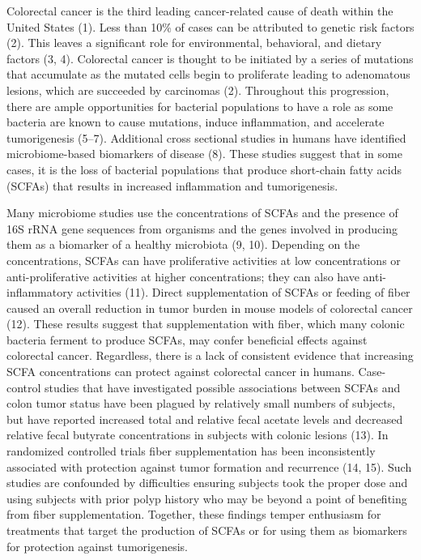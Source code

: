 \documentclass[11pt,]{article}
\begin{document}
\newpage

Colorectal cancer is the third leading cancer-related cause of death
within the United States (1). Less than 10\% of cases can be attributed
to genetic risk factors (2). This leaves a significant role for
environmental, behavioral, and dietary factors (3, 4). Colorectal cancer
is thought to be initiated by a series of mutations that accumulate as
the mutated cells begin to proliferate leading to adenomatous lesions,
which are succeeded by carcinomas (2). Throughout this progression,
there are ample opportunities for bacterial populations to have a role
as some bacteria are known to cause mutations, induce inflammation, and
accelerate tumorigenesis (5--7). Additional cross sectional studies in
humans have identified microbiome-based biomarkers of disease (8). These
studies suggest that in some cases, it is the loss of bacterial
populations that produce short-chain fatty acids (SCFAs) that results in
increased inflammation and tumorigenesis.

Many microbiome studies use the concentrations of SCFAs and the presence
of 16S rRNA gene sequences from organisms and the genes involved in
producing them as a biomarker of a healthy microbiota (9, 10). Depending
on the concentrations, SCFAs can have proliferative activities at low
concentrations or anti-proliferative activities at higher
concentrations; they can also have anti-inflammatory activities (11).
Direct supplementation of SCFAs or feeding of fiber caused an overall
reduction in tumor burden in mouse models of colorectal cancer (12).
These results suggest that supplementation with fiber, which many
colonic bacteria ferment to produce SCFAs, may confer beneficial effects
against colorectal cancer. Regardless, there is a lack of consistent
evidence that increasing SCFA concentrations can protect against
colorectal cancer in humans. Case-control studies that have investigated
possible associations between SCFAs and colon tumor status have been
plagued by relatively small numbers of subjects, but have reported
increased total and relative fecal acetate levels and decreased relative
fecal butyrate concentrations in subjects with colonic lesions (13). In
randomized controlled trials fiber supplementation has been
inconsistently associated with protection against tumor formation and
recurrence (14, 15). Such studies are confounded by difficulties
ensuring subjects took the proper dose and using subjects with prior
polyp history who may be beyond a point of benefiting from fiber
supplementation. Together, these findings temper enthusiasm for
treatments that target the production of SCFAs or for using them as
biomarkers for protection against tumorigenesis.
\end{document}
